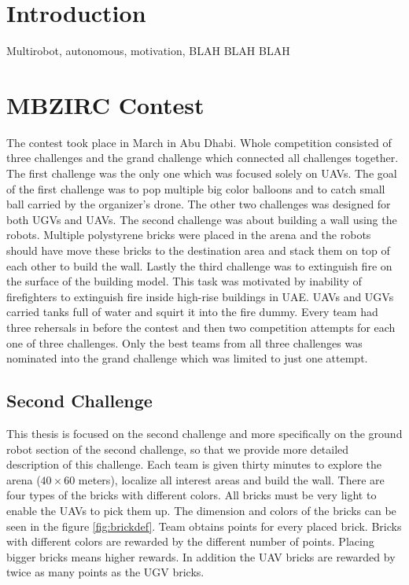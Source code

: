 \section{Introduction}
Multirobot, autonomous, motivation, BLAH BLAH BLAH


\section{MBZIRC Contest}
The contest took place in March in Abu Dhabi. Whole competition consisted of three challenges and the grand challenge which connected all challenges together. The first challenge was the only one which was focused solely on UAVs. The goal of the first challenge was to pop multiple big color balloons and to catch small ball carried by the organizer's drone. The other two challenges was designed for both UGVs and UAVs. The second challenge was about building a wall using the robots. Multiple polystyrene bricks were placed in the arena and the robots should have move these bricks to the destination area and stack them on top of each other to build the wall. Lastly the third challenge was to extinguish fire on the surface of the building model. This task was motivated by inability of firefighters to extinguish fire inside high-rise buildings in UAE. UAVs and UGVs carried tanks full of water and squirt it into the fire dummy. Every team had three rehersals in before the contest and then two competition attempts for each one of three challenges. Only the best teams from all three challenges was nominated into the grand challenge which was limited to just one attempt.

\subsection{Second Challenge}
This thesis is focused on the second challenge and more specifically on the ground robot section of the second challenge, so that we provide more detailed description of this challenge. Each team is given thirty minutes to explore the arena ($40 \times 60$ meters), localize all interest areas and build the wall. There are four types of the bricks with different colors. All bricks must be very light to enable the UAVs to pick them up. The dimension and colors of the bricks can be seen in the figure \ref{fig:brickdef}. Team obtains points for every placed brick. Bricks with different colors are rewarded by the different number of points. Placing bigger bricks means higher rewards. In addition the UAV bricks are rewarded by twice as many points as the UGV bricks.

